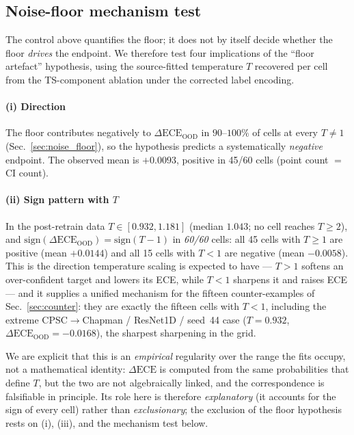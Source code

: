 \documentclass[final,5p,times,nonatbib]{elsarticle}
\begin{document}
\subsection{Noise-floor mechanism test}
\label{sec:noise_mechanism}
The control above quantifies the floor; it does not by itself decide
whether the floor \emph{drives} the endpoint. We therefore test four
implications of the ``floor artefact'' hypothesis, using the
source-fitted temperature $T$ recovered per cell from the TS-component
ablation under the corrected label encoding.

\paragraph{(i) Direction} The floor contributes negatively to
$\Delta\text{ECE}_{\text{OOD}}$ in $90$--$100\%$ of cells at every
$T \neq 1$ (Sec.~\ref{sec:noise_floor}), so the hypothesis predicts a
systematically \emph{negative} endpoint. The observed mean is
$+0.0093$, positive in 45/60 cells (point count $=$ CI count).

\paragraph{(ii) Sign pattern with $T$} In the post-retrain data
$T \in [0.932, 1.181]$ (median $1.043$; no cell reaches $T \geq 2$), and
$\mathrm{sign}(\Delta\text{ECE}_{\text{OOD}}) = \mathrm{sign}(T - 1)$ in
\emph{60/60} cells: all 45 cells with $T \geq 1$ are positive (mean
$+0.0144$) and all 15 cells with $T < 1$ are negative (mean $-0.0058$).
This is the direction temperature scaling is expected to have --- $T>1$
softens an over-confident target and lowers its ECE, while $T<1$ sharpens
it and raises ECE --- and it supplies a unified mechanism for the fifteen
counter-examples of Sec.~\ref{sec:counter}: they are exactly the fifteen
cells with $T<1$, including the extreme CPSC$\rightarrow$Chapman /
ResNet1D / seed~44 case ($T = 0.932$,
$\Delta\text{ECE}_{\text{OOD}} = -0.0168$), the sharpest sharpening in
the grid.

We are explicit that this is an \emph{empirical} regularity over the
range the fits occupy, not a mathematical identity: $\Delta\text{ECE}$
is computed from the same probabilities that define $T$, but the two are
not algebraically linked, and the correspondence is falsifiable in
principle. Its role
here is therefore \emph{explanatory} (it accounts for the sign of every
cell) rather than \emph{exclusionary}; the exclusion of the floor
hypothesis rests on (i), (iii), and the mechanism test below.
\end{document}
